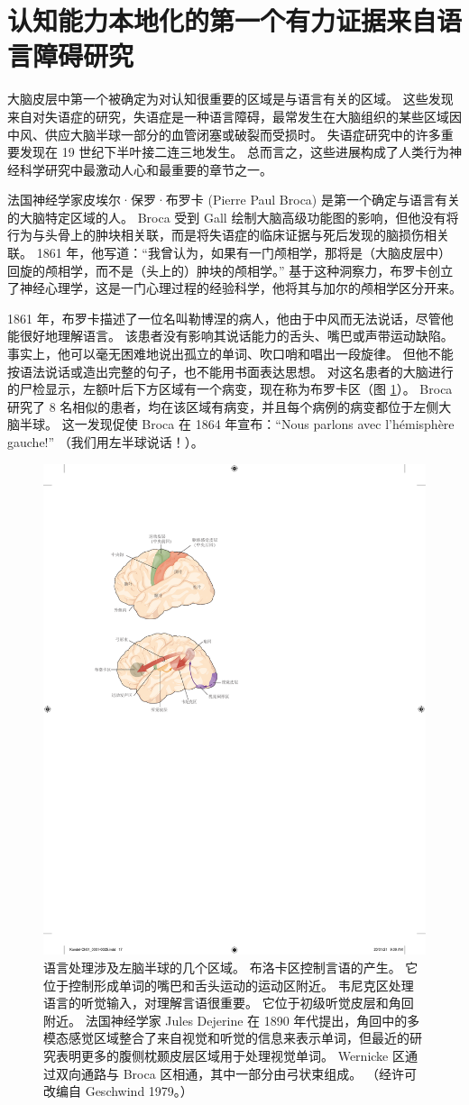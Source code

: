 \section{认知能力本地化的第一个有力证据来自语言障碍研究}

大脑皮层中第一个被确定为对认知很重要的区域是与语言有关的区域。 这些发现来自对失语症的研究，失语症是一种语言障碍，最常发生在大脑组织的某些区域因中风、供应大脑半球一部分的血管闭塞或破裂而受损时。 
失语症研究中的许多重要发现在 19 世纪下半叶接二连三地发生。 
总而言之，这些进展构成了人类行为神经科学研究中最激动人心和最重要的章节之一。


法国神经学家皮埃尔·保罗·布罗卡 (Pierre Paul Broca) 是第一个确定与语言有关的大脑特定区域的人。 
Broca 受到 Gall 绘制大脑高级功能图的影响，但他没有将行为与头骨上的肿块相关联，而是将失语症的临床证据与死后发现的脑损伤相关联。 
1861 年，他写道：“我曾认为，如果有一门颅相学，那将是（大脑皮层中）回旋的颅相学，而不是（头上的）肿块的颅相学。” 
基于这种洞察力，布罗卡创立了神经心理学，这是一门心理过程的经验科学，他将其与加尔的颅相学区分开来。


1861 年，布罗卡描述了一位名叫勒博涅的病人，他由于中风而无法说话，尽管他能很好地理解语言。 
该患者没有影响其说话能力的舌头、嘴巴或声带运动缺陷。 
事实上，他可以毫无困难地说出孤立的单词、吹口哨和唱出一段旋律。 
但他不能按语法说话或造出完整的句子，也不能用书面表达思想。 
对这名患者的大脑进行的尸检显示，左额叶后下方区域有一个病变，现在称为布罗卡区（图 \ref{fig:1_6}）。 
Broca 研究了 8 名相似的患者，均在该区域有病变，并且每个病例的病变都位于左侧大脑半球。 
这一发现促使 Broca 在 1864 年宣布：“Nous parlons avec l’hémisphère gauche!” （我们用左半球说话！）。

\begin{figure}[htbp]
	\centering
	\includegraphics[width=0.5\linewidth]{chap01/fig_1_6}
	\caption{语言处理涉及左脑半球的几个区域。 
		布洛卡区控制言语的产生。 
		它位于控制形成单词的嘴巴和舌头运动的运动区附近。 
		韦尼克区处理语言的听觉输入，对理解言语很重要。 
		它位于初级听觉皮层和角回附近。 
		法国神经学家 Jules Dejerine 在 1890 年代提出，角回中的多模态感觉区域整合了来自视觉和听觉的信息来表示单词，但最近的研究表明更多的腹侧枕颞皮层区域用于处理视觉单词。 
		Wernicke 区通过双向通路与 Broca 区相通，其中一部分由弓状束组成。 （经许可改编自 Geschwind 1979。）}
	\label{fig:1_6}
\end{figure}


